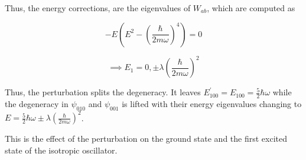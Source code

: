     Thus, the energy corrections, are the eigenvalues of $W_{ab}$, which are computed as 

    \begin{equation*}
        -E\left( E^2 - \left( \frac{\hbar}{2m\omega} \right)^4 \right) = 0 
    \end{equation*}

    \begin{equation*}
        \implies E_1 = 0, \pm\lambda\left( \frac{\hbar}{2m\omega} \right)^2
    \end{equation*}

    Thus, the perturbation splits the degeneracy. It leaves $E^{'}_{100} = E_{100} = \frac{5}{2}\hbar\omega$ while the degeneracy in $\psi_{010}$ and $\psi_{001}$ is lifted with their energy eigenvalues changing to $E = \frac{5}{2}\hbar\omega \pm\lambda\left( \frac{\hbar}{2m\omega} \right)^2$.

    This is the effect of the perturbation on the ground state and the first excited state of the isotropic oscillator.


